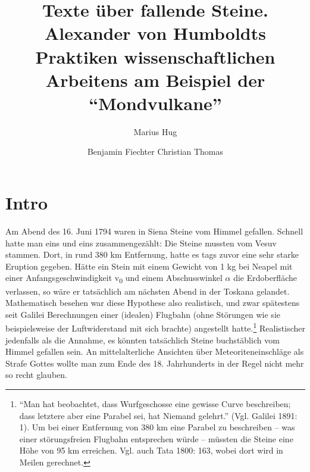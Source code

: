 
\title{Texte über fallende Steine. Alexander von Humboldts Praktiken wissenschaftlichen Arbeitens am Beispiel der \enquote{Mondvulkane}} 
\author{Marius Hug \and Benjamin Fiechter \lastand  Christian Thomas} 



\maketitle

\section*{Intro}\label{intro}

Am Abend des 16. Juni 1794 waren in Siena Steine vom Himmel gefallen.
Schnell hatte man eins und eins zusammengezählt: Die Steine mussten vom
Vesuv stammen. Dort, in rund 380 km Entfernung, hatte es tags zuvor eine
sehr starke Eruption gegeben. Hätte ein Stein mit einem Gewicht von 1 kg
bei Neapel mit einer Anfangsgeschwindigkeit v\textsubscript{0} und einem
Abschusswinkel $\alpha$ die Erdoberfläche verlassen, so wäre er tatsächlich am
nächsten Abend in der Toskana gelandet. Mathematisch besehen war diese
Hypothese also realistisch, und zwar spätestens seit Galilei
Berechnungen einer (idealen) Flugbahn (ohne Störungen wie sie
beispielsweise der Luftwiderstand mit sich brachte) angestellt
hatte.\footnote{\enquote{Man hat beobachtet, dass Wurfgeschosse eine
  gewisse Curve beschreiben; dass letztere aber eine Parabel sei, hat
  Niemand gelehrt.} (Vgl. Galilei 1891: 1). Um bei einer Entfernung von
  380 km eine Parabel zu beschreiben -- was einer störungsfreien
  Flugbahn entsprechen würde -- müssten die Steine eine Höhe von 95 km
  erreichen. Vgl. auch Tata 1800: 163, wobei dort wird in Meilen
  gerechnet.} Realistischer jedenfalls als die Annahme, es könnten
tatsächlich Steine buchstäblich vom Himmel gefallen sein. An
mittelalterliche Ansichten über Meteoriteneinschläge als Strafe Gottes
wollte man zum Ende des 18. Jahrhunderts in der Regel nicht mehr so
recht glauben.

